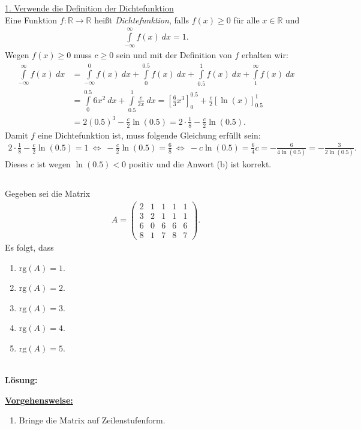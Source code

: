 \underline{1. Verwende die Definition der Dichtefunktion}\\
Eine Funktion $f : \mathbb{R} \to \mathbb{R}$ heißt \textit{Dichtefunktion}, falls $f(x) \geq 0$ für alle $x \in \mathbb{R}$ und
\begin{align*}
	\int \limits_{- \infty}^\infty f(x) \ dx = 1.
\end{align*}
Wegen $f(x) \geq 0 $ muss $c \geq 0 $ sein und mit der Definition von $f$ erhalten wir:
\begin{align*}
	\int \limits_{- \infty}^\infty f(x) \ dx
	&=
	\int \limits_{- \infty}^0 f(x) \ dx
	+
	\int \limits_{0}^{0.5} f(x) \ dx
	+
	\int \limits_{0.5}^{1} f(x) \ dx
	+
	\int \limits_{1}^{\infty} f(x) \ dx\\
	&=
	\int \limits_{0}^{0.5} 6x^2 \ dx
	+
	\int \limits_{0.5}^{1} \frac{c}{2x} \ dx
	=
	\left[\frac{6}{3} x^3 \right]_0^{0.5}
	+
	\frac{c}{2} \left[\ln(x)\right]_{0.5}^1\\
	&=
	2 (0.5)^3 - \frac{c}{2} \ln(0.5)	
	=
	2 \cdot \frac{1}{8} - \frac{c}{2} \ln(0.5).
\end{align*}
Damit $f$ eine Dichtefunktion ist, muss folgende Gleichung erfüllt sein:
\begin{align*}
	2 \cdot \frac{1}{8} - \frac{c}{2} \ln(0.5) = 1
	\ \Leftrightarrow \
	- \frac{c}{2} \ln(0.5) = \frac{6}{8}
	\ \Leftrightarrow \
	- c \ln(0.5) = \frac{6}{4}
	c = - \frac{6}{4 \ln(0.5)} = -\frac{3}{2 \ln(0.5)}.
\end{align*}
Dieses $c$ ist wegen $\ln(0.5 ) < 0 $ positiv und die Anwort (b) ist korrekt.

\newpage

\subsection*{}
Gegeben sei die Matrix
\begin{align*}
	A =
	\begin{pmatrix}
		2 & 1 & 1 & 1 & 1 \\
		3 & 2 & 1 & 1 & 1 \\
		6 & 0 & 6 & 6 & 6 \\ 
		8 & 1 & 7 & 8 & 7
	\end{pmatrix}.
\end{align*}
Es folgt, dass
\renewcommand{\labelenumi}{(\alph{enumi})}
\begin{enumerate}
	\item 
	$ \mathrm{rg}(A) = 1 $.
	\item 
	$ \mathrm{rg}(A) = 2 $.
	\item
	$ \mathrm{rg}(A) = 3 $.
	\item
	$ \mathrm{rg}(A) = 4 $.
	\item
	$ \mathrm{rg}(A) = 5 $.
\end{enumerate}
\ \\
\textbf{Lösung:}
\begin{mdframed}
\underline{\textbf{Vorgehensweise:}}
\renewcommand{\labelenumi}{\theenumi.}
\begin{enumerate}
\item Bringe die Matrix auf Zeilenstufenform.
\end{enumerate}
\end{mdframed}

